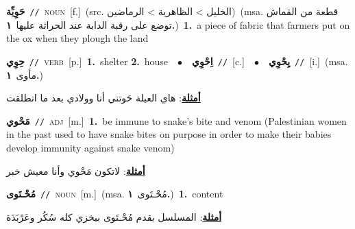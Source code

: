 \documentclass[10pt,a4paper,twoside]{article} %
\begin{document}
\begin{multicols}{2}
{\setlength\topsep{0pt}\textbf{\foreignlanguage{arabic}{حَوِيِّة}}\ {\color{gray}\texttt{//}\color{black}}\ \textsc{noun}\ [f.]\ (src. \color{gray}\foreignlanguage{arabic}{الخليل > الظاهرية > الرماضين}\color{black})\ \color{gray}(msa. \foreignlanguage{arabic}{قطعة من القماش توضع على رقبة الدابة عند الحراثة عليها}~\foreignlanguage{arabic}{\textbf{١.}})\color{black}\ \textbf{1.}~a piece of fabric that farmers put on the ox when they plough the land\ } \vspace{2mm}

{\setlength\topsep{0pt}\textbf{\foreignlanguage{arabic}{حِوِي}}\ {\color{gray}\texttt{//}\color{black}}\ \textsc{verb}\ [p.]\ \textbf{1.}~shelter  \textbf{2.}~house\ \ $\bullet$\ \ \setlength\topsep{0pt}\textbf{\foreignlanguage{arabic}{اِحْوِي}}\ {\color{gray}\texttt{//}\color{black}}\ [c.]\ \ $\bullet$\ \ \setlength\topsep{0pt}\textbf{\foreignlanguage{arabic}{يِحْوِي}}\ {\color{gray}\texttt{//}\color{black}}\ [i.]\ \color{gray}(msa. \foreignlanguage{arabic}{مأوى}~\foreignlanguage{arabic}{\textbf{١.}})\color{black}\  \begin{flushright}\color{gray}\foreignlanguage{arabic}{\textbf{\underline{\foreignlanguage{arabic}{أمثلة}}}: هاي العيلة حَوتني أنا وولادي بعد ما اتطلقت}\end{flushright}\color{black}} \vspace{2mm}

{\setlength\topsep{0pt}\textbf{\foreignlanguage{arabic}{مَحْوي}}\ {\color{gray}\texttt{//}\color{black}}\ \textsc{adj}\ [m.]\ \textbf{1.}~be immune to snake's bite and venom (Palestinian women in the past used to have snake bites on purpose in order to make their babies develop immunity against snake venom)\  \begin{flushright}\color{gray}\foreignlanguage{arabic}{\textbf{\underline{\foreignlanguage{arabic}{أمثلة}}}: لاتكون مَحْوي وأنا معيش خبر}\end{flushright}\color{black}} \vspace{2mm}

{\setlength\topsep{0pt}\textbf{\foreignlanguage{arabic}{مُحْـتَوى}}\ {\color{gray}\texttt{//}\color{black}}\ \textsc{noun}\ [m.]\ \color{gray}(msa. \foreignlanguage{arabic}{مُحْـتَوى}~\foreignlanguage{arabic}{\textbf{١.}})\color{black}\ \textbf{1.}~content\  \begin{flushright}\color{gray}\foreignlanguage{arabic}{\textbf{\underline{\foreignlanguage{arabic}{أمثلة}}}: المسلسل بقدم مُحْـتَوى بيخزي كله سُكُر وعَرْبَدَة}\end{flushright}\color{black}} \vspace{2mm}


\end{multicols}
\end{document}
